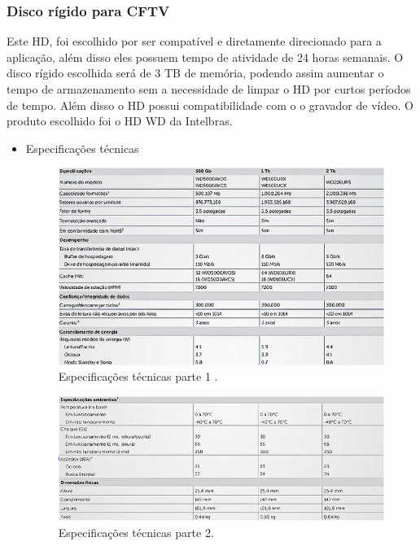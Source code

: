 \subsubsection{Disco rígido para CFTV}

	Este HD, foi escolhido por ser compatível e diretamente direcionado para a aplicação, além disso eles possuem tempo de atividade de 24 horas semanais. O disco rígido escolhida será de 3 TB de memória, podendo assim aumentar o tempo de armazenamento sem a necessidade de limpar o HD por curtos períodos de tempo. Além disso o HD possui compatibilidade com o o gravador de vídeo. O produto escolhido foi o HD WD da Intelbras.

\begin{itemize}
	\item Especificações técnicas
	
	\begin{figure}[H]
	 \centering
	\label{Especificações técnicas parte 1}
	 \includegraphics[keepaspectratio=true,scale=0.8]{monitoramento/21.png}
	 \caption{Especificações técnicas parte 1 .}
	\end{figure}
	

	\begin{figure}[H]
	 \centering
	\label{Especificações técnicas parte 2}
	 \includegraphics[keepaspectratio=true,scale=0.8]{monitoramento/22.png}
	 \caption{Especificações técnicas parte 2.}
	\end{figure}
	
\end{itemize}

